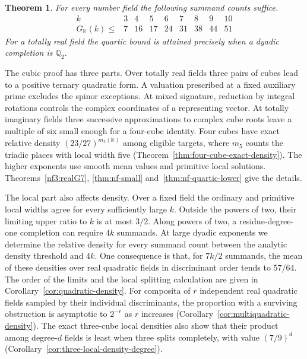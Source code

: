 \documentclass[11pt,letterpaper]{article}
\newtheorem{theorem}{Theorem}[section]
\theoremstyle{definition}
\numberwithin{equation}{section}
\begin{document}
\begin{theorem}\label{thm:intro-small}
For every number field the following summand counts suffice.
\[
\begin{array}{c|rrrrrrrr}
 k&3&4&5&6&7&8&9&10\\\hline
 G_{\mathbb K}(k)\le&7&16&17&24&31&38&44&51
\end{array}
\]
For a totally real field the quartic bound is attained precisely when
a dyadic completion is $\mathbb Q_2$.
\end{theorem}
The cubic proof has three parts. Over totally real fields three pairs
of cubes lead to a positive ternary quadratic form. A valuation prescribed
at a fixed auxiliary prime excludes the spinor exceptions. At mixed
signature, reduction by integral rotations controls the complex
coordinates of a representing vector. At totally imaginary fields
three successive approximations to complex cube roots leave a
multiple of six small enough for a four-cube identity.
Four cubes have exact relative density $(23/27)^{m_5(\mathbb K)}$ among eligible targets, where $m_5$ counts the triadic places with local width five (Theorem~\ref{thm:four-cube-exact-density}). The higher exponents use smooth mean values and primitive local
solutions. Theorems~\ref{nf3:realG7}, \ref{thm:nf-small}
and~\ref{thm:nf-quartic-lower} give the details.

The local part also affects density. Over a fixed field the ordinary
and primitive local widths agree for every sufficiently large $k$.
Outside the powers of two, their limiting upper ratio to $k$ is at most
$3/2$. Along powers of two, a residue-degree-one completion can
require $4k$ summands. At large dyadic exponents we determine the
relative density for every summand count between the analytic
density threshold and $4k$. One consequence is that, for $7k/2$
summands, the mean of these densities over real quadratic fields
in discriminant order tends to $57/64$. The order of the limits and
the local splitting calculation are given in
Corollary~\ref{cor:quadratic-density}. For composita of $r$ independent real quadratic fields sampled by their individual discriminants, the proportion with a surviving obstruction is asymptotic to $2^{-r}$ as $r$ increases (Corollary~\ref{cor:multiquadratic-density}). The exact three-cube local densities also show that their product among degree-$d$ fields is least when three splits completely, with value $(7/9)^d$ (Corollary~\ref{cor:three-local-density-degree}).
\end{document}
